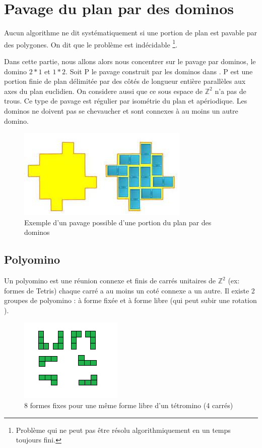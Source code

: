 \documentclass{article}
\begin{document}
\newpage

\section{Pavage du plan par des dominos}

Aucun algorithme ne dit systématiquement si une portion de plan est pavable par des polygones.
On dit que le problème est indécidable \footnote{Problème qui ne peut pas être résolu algorithmiquement en un temps toujours fini.}.

Dans cette partie, nous allons alors nous concentrer sur le pavage par dominos, le domino $2*1$ et $1*2$.
Soit P le pavage construit par les dominos dans . P est une portion finie de plan délimitée par des côtés de longueur entière parallèles aux axes du plan euclidien.
On considere aussi que ce sous espace de $\mathbb{Z}^{2}$ n’a pas de trous. Ce type de pavage est régulier par isométrie du plan et apériodique.
Les dominos ne doivent pas se chevaucher et sont connexes à au moins un autre domino.

\begin{figure} [h]
    \center
    \includegraphics [scale=0.5] {image/pavage_domino.jpg}
    \caption{Exemple d'un pavage possible d'une portion du plan par des dominos }
\end{figure}

\clearpage

\subsection{Polyomino}

Un polyomino est une réunion connexe et finis de carrés unitaires de $\mathbb{Z}^{2}$ (ex: formes de Tetris) chaque carré a au moins un coté connexe a un autre.
Il existe 2 groupes de polyomino : à forme fixée et à forme libre (qui peut subir une rotation ).

\begin{figure} [!h]
    \center
    \includegraphics [scale=0.5] {image/polyomino_libre.png}
    \caption{8 formes fixes pour une même forme libre d'un tétromino (4 carrés)}
\end{figure}
\end{document}
